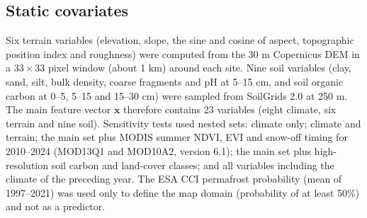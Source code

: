 \subsection{Static covariates}
Six terrain variables (elevation, slope, the sine and cosine of aspect, topographic position index and roughness) were computed from the 30 m Copernicus DEM\cite{CopDEM2021} in a $33\times33$ pixel window (about 1 km) around each site. Nine soil variables (clay, sand, silt, bulk density, coarse fragments and pH at 5--15 cm, and soil organic carbon at 0--5, 5--15 and 15--30 cm) were sampled from SoilGrids 2.0 at 250 m\cite{Poggio2021}. The main feature vector $\mathbf{x}$ therefore contains 23 variables (eight climate, six terrain and nine soil). Sensitivity tests used nested sets: climate only; climate and terrain; the main set plus MODIS summer NDVI, EVI and snow-off timing for 2010--2024 (MOD13Q1 and MOD10A2, version 6.1)\cite{Didan2021,HallRiggs2021}; the main set plus high-resolution soil carbon and land-cover classes\cite{Palmtag2022}; and all variables including the climate of the preceding year. The ESA CCI permafrost probability (mean of 1997--2021)\cite{Westermann2024} was used only to define the map domain (probability of at least 50\%) and not as a predictor.

